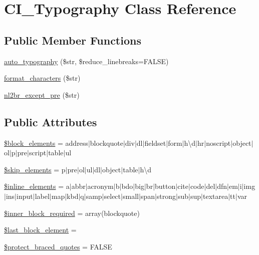 \hypertarget{class_c_i___typography}{}\section{C\+I\+\_\+\+Typography Class Reference}
\label{class_c_i___typography}
\subsection*{Public Member Functions}
\begin{DoxyCompactItemize}
\item 
\mbox{\hyperlink{class_c_i___typography_a24c284b560f34d6c7fad07e36baaa024}{auto\+\_\+typography}} (\$str, \$reduce\+\_\+linebreaks=F\+A\+L\+SE)
\item 
\mbox{\hyperlink{class_c_i___typography_a45df135c8811c2b27085dbdfd05a1eed}{format\+\_\+characters}} (\$str)
\item 
\mbox{\hyperlink{class_c_i___typography_af9db9732eaa94a62b3a3ccc7f6bf860b}{nl2br\+\_\+except\+\_\+pre}} (\$str)
\end{DoxyCompactItemize}
\subsection*{Public Attributes}
\begin{DoxyCompactItemize}
\item 
\mbox{\hyperlink{class_c_i___typography_ac99f5bbe8e02dc1147e9a4205dc161eb}{\$block\+\_\+elements}} = \textquotesingle{}address$\vert$blockquote$\vert$div$\vert$dl$\vert$fieldset$\vert$form$\vert$h\textbackslash{}d$\vert$hr$\vert$noscript$\vert$object$\vert$ol$\vert$p$\vert$pre$\vert$script$\vert$table$\vert$ul\textquotesingle{}
\item 
\mbox{\hyperlink{class_c_i___typography_a80c70a349bff88ad1ef94dea8753bc2e}{\$skip\+\_\+elements}} = \textquotesingle{}p$\vert$pre$\vert$ol$\vert$ul$\vert$dl$\vert$object$\vert$table$\vert$h\textbackslash{}d\textquotesingle{}
\item 
\mbox{\hyperlink{class_c_i___typography_a7ee5f0598125dc7e6b17a08aa6da384f}{\$inline\+\_\+elements}} = \textquotesingle{}a$\vert$abbr$\vert$acronym$\vert$b$\vert$bdo$\vert$big$\vert$br$\vert$button$\vert$cite$\vert$code$\vert$del$\vert$dfn$\vert$em$\vert$i$\vert$img$\vert$ins$\vert$input$\vert$label$\vert$map$\vert$kbd$\vert$q$\vert$samp$\vert$select$\vert$small$\vert$span$\vert$strong$\vert$sub$\vert$sup$\vert$textarea$\vert$tt$\vert$var\textquotesingle{}
\item 
\mbox{\hyperlink{class_c_i___typography_a822eaf22f556c5c52bd766779d9ee22f}{\$inner\+\_\+block\+\_\+required}} = array(\textquotesingle{}blockquote\textquotesingle{})
\item 
\mbox{\hyperlink{class_c_i___typography_a8d5c4b7f2f7b74e118c682cf95688e22}{\$last\+\_\+block\+\_\+element}} = \textquotesingle{}\textquotesingle{}
\item 
\mbox{\hyperlink{class_c_i___typography_a6a74364571da23cc7187c864cde167ca}{\$protect\+\_\+braced\+\_\+quotes}} = F\+A\+L\+SE
\end{DoxyCompactItemize}
